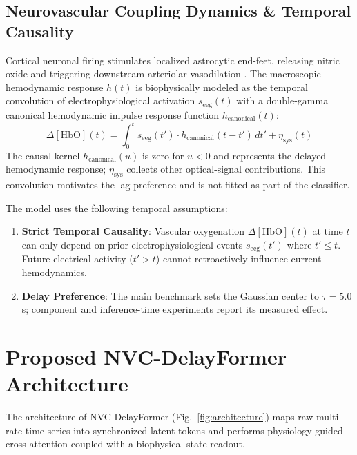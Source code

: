\documentclass[final,5p,times,twocolumn]{elsarticle}
\begin{document}
\subsection{Neurovascular Coupling Dynamics \& Temporal Causality}
Cortical neuronal firing stimulates localized astrocytic end-feet, releasing nitric oxide and triggering downstream arteriolar vasodilation \cite{attwell2010glial, iadecola2004neurovascular}. The macroscopic hemodynamic response $h(t)$ is biophysically modeled as the temporal convolution of electrophysiological activation $s_{\text{eeg}}(t)$ with a double-gamma canonical hemodynamic impulse response function $h_{\text{canonical}}(t)$:
\begin{equation}
\Delta[\text{HbO}](t) = \int_{0}^{t} s_{\text{eeg}}(t') \cdot h_{\text{canonical}}(t - t') \, dt' + \eta_{\text{sys}}(t)
\end{equation}
The causal kernel $h_{\mathrm{canonical}}(u)$ is zero for $u<0$ and represents the delayed hemodynamic response; $\eta_{\mathrm{sys}}$ collects other optical-signal contributions. This convolution motivates the lag preference and is not fitted as part of the classifier.

The model uses the following temporal assumptions:
\begin{enumerate}
    \item \textbf{Strict Temporal Causality}: Vascular oxygenation $\Delta[\text{HbO}](t)$ at time $t$ can only depend on prior electrophysiological events $s_{\text{eeg}}(t')$ where $t' \le t$. Future electrical activity ($t' > t$) cannot retroactively influence current hemodynamics.
    \item \textbf{Delay Preference}: The main benchmark sets the Gaussian center to $\tau=5.0$\,s; component and inference-time experiments report its measured effect.
\end{enumerate}

\section{Proposed NVC-DelayFormer Architecture}
\label{sec:architecture}
The architecture of NVC-DelayFormer (Fig.~\ref{fig:architecture}) maps raw multi-rate time series into synchronized latent tokens and performs physiology-guided cross-attention coupled with a biophysical state readout.
\end{document}
